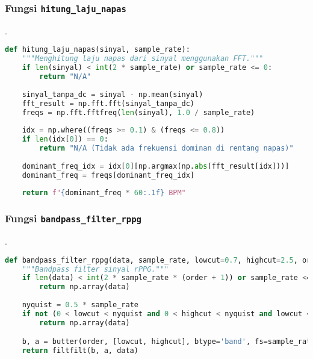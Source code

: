 \documentclass[11pt,a4paper]{article}
\begin{document}
\subsubsection{Fungsi \texttt{hitung\_laju\_napas}}.
     \begin{lstlisting}[language=Python, caption=Fungsi \texttt{hitung\_laju\_napas},label={labelkode}]
    def hitung_laju_napas(sinyal, sample_rate):
    """Menghitung laju napas dari sinyal menggunakan FFT."""
    if len(sinyal) < int(2 * sample_rate) or sample_rate <= 0:
        return "N/A"
    
    sinyal_tanpa_dc = sinyal - np.mean(sinyal)
    fft_result = np.fft.fft(sinyal_tanpa_dc)
    freqs = np.fft.fftfreq(len(sinyal), 1.0 / sample_rate)
    
    idx = np.where((freqs >= 0.1) & (freqs <= 0.8)) 
    if len(idx[0]) == 0:
        return "N/A (Tidak ada frekuensi dominan di rentang napas)"
    
    dominant_freq_idx = idx[0][np.argmax(np.abs(fft_result[idx]))]
    dominant_freq = freqs[dominant_freq_idx]
    
    return f"{dominant_freq * 60:.1f} BPM"
    \end{lstlisting}

\subsubsection{Fungsi \texttt{bandpass\_filter\_rppg}}.
     \begin{lstlisting}[language=Python, caption=Fungsi \texttt{bandpass\_filter\_rppg},label={labelkode}]
     def bandpass_filter_rppg(data, sample_rate, lowcut=0.7, highcut=2.5, order=4):
    """Bandpass filter sinyal rPPG."""
    if len(data) < int(2 * sample_rate * (order + 1)) or sample_rate <=0: 
        return np.array(data)
    
    nyquist = 0.5 * sample_rate
    if not (0 < lowcut < nyquist and 0 < highcut < nyquist and lowcut < highcut):
        return np.array(data)

    b, a = butter(order, [lowcut, highcut], btype='band', fs=sample_rate)
    return filtfilt(b, a, data)
    \end{lstlisting}
\end{document}
